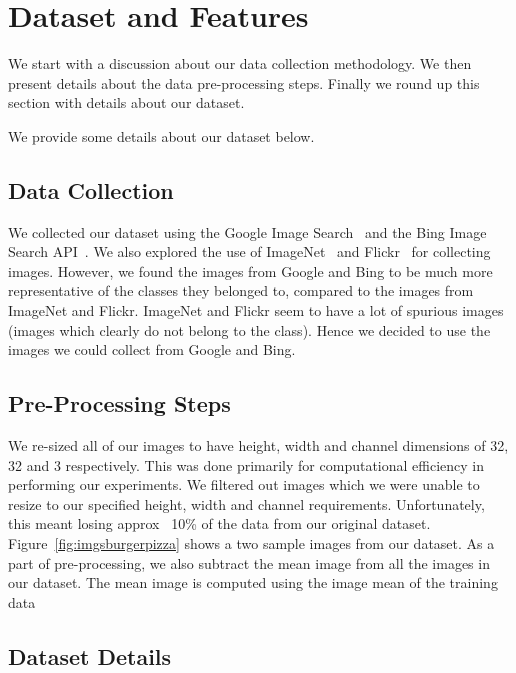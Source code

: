 \section{Dataset and Features}
\label{sec:datasetandfeatures}

We start with a discussion about our data collection methodology. We then present details about the data pre-processing steps. Finally we round up this section with details about our dataset.

We provide some details about our dataset below.

\subsection{Data Collection}
\label{subsec:datacollection}

We collected our dataset using the Google Image Search~\cite{googleimagesearch} and the Bing Image Search API~\cite{bingimagesearchapi}. We also explored the use of ImageNet~\cite{imagenet} and Flickr~\cite{flickr} for collecting images. However, we found the images from Google and Bing to be much more representative of the classes they belonged to, compared to the images from ImageNet and Flickr. ImageNet and Flickr seem to have a lot of spurious images (images which clearly do not belong to the class). Hence we decided to use the images we could collect from Google and Bing.

\subsection{Pre-Processing Steps}
\label{subsec:preprocessingsteps}

We re-sized all of our images to have height, width and channel dimensions of 32, 32 and 3 respectively. This was done primarily for computational efficiency in performing our experiments. We filtered out images which we were unable to resize to our specified height, width and channel requirements. Unfortunately, this meant losing approx ~10\% of the data from our original dataset. Figure~\ref{fig:imgsburgerpizza} shows a two sample images from our dataset. As a part of pre-processing, we also subtract the mean image from all the images in our dataset. The mean image is computed using the image mean of the training data

\subsection{Dataset Details}


